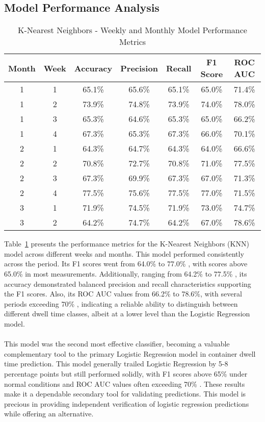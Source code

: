 		\subsection{Model Performance Analysis}
			\begin{table}[H]
				\centering
				\begin{tabular}{|c|c|c|c|c|c|c|}
					\hline
					\textbf{Month} & \textbf{Week} & \textbf{Accuracy} & \textbf{Precision} & \textbf{Recall}
					& \textbf{F1 Score}
					& \textbf{ROC AUC}
					\\ \hline
					1 & 1 & 65.1\% & 65.6\% & 65.1\% & 65.0\%
					& 71.4\% \\ \hline
					1 & 2 & 73.9\% & 74.8\% & 73.9\% & 74.0\%
					& 78.0\% \\ \hline
					1 & 3 & 65.3\% & 64.6\% & 65.3\% & 65.0\%
					& 66.2\% \\ \hline
					1 & 4 & 67.3\% & 65.3\% & 67.3\% & 66.0\%
					& 70.1\% \\ \hline
					2 & 1 & 64.3\% & 64.7\% & 64.3\% & 64.0\%
					& 66.6\% \\ \hline
					2 & 2 & 70.8\% & 72.7\% & 70.8\% & 71.0\%
					& 77.5\% \\ \hline
					2 & 3 & 67.3\% & 69.9\% & 67.3\% & 67.0\%
					& 71.3\% \\ \hline
					2 & 4 & 77.5\% & 75.6\% & 77.5\% & 77.0\%
					& 71.5\% \\ \hline
					3 & 1 & 71.9\% & 74.5\% & 71.9\% & 73.0\%
					& 74.7\% \\ \hline
					3 & 2 & 64.2\% & 74.7\% & 64.2\% & 67.0\%
					& 78.6\% \\ \hline
				\end{tabular}
				\caption{K-Nearest Neighbors - Weekly and Monthly Model Performance Metrics}
				\label{tab:weekly_monthly_performance_knn}
			\end{table}

			Table~\ref{tab:weekly_monthly_performance_knn}
			presents the performance metrics for the K-Nearest Neighbors (KNN) model across different weeks
			and months. This model performed consistently across the period. Its F1 scores went from 64.0\% to 77.0\%
			, with scores above 65.0\% in most measurements. Additionally, ranging from 64.2\% to 77.5\%
			, its accuracy demonstrated balanced precision and recall characteristics supporting the F1 scores.
			Also, its ROC AUC values from 66.2\% to 78.6\%, with several periods exceeding 70\%
			, indicating a reliable ability to distinguish between different dwell time classes, albeit at a
			lower level than the Logistic Regression model.
			\\
			\\
			This model was the second most effective classifier, becoming a valuable complementary tool to the primary
			Logistic Regression model in container dwell time prediction. This model generally trailed Logistic
			Regression by 5-8 percentage points but still performed solidly, with F1 scores above 65\%
			under normal conditions and ROC AUC values often exceeding 70\%
			. These results make it a dependable secondary tool for validating predictions. This model is
			precious in providing independent verification of logistic regression predictions while offering an
			alternative.

